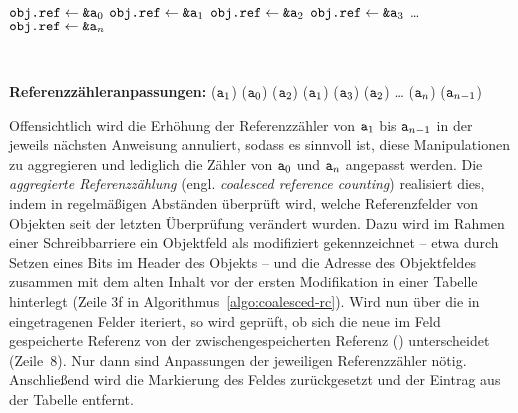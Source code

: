 \begin{center}
\begin{minipage}{0.3\textwidth}
	\centering
	\begin{algorithmic}[1]
		\Statex $\texttt{obj.ref} \gets \texttt{\&a}_0$
		\Statex $\texttt{obj.ref} \gets \texttt{\&a}_1$
		\Statex $\texttt{obj.ref} \gets \texttt{\&a}_2$
		\Statex $\texttt{obj.ref} \gets \texttt{\&a}_3$
		\Statex \dots
		\Statex $\texttt{obj.ref} \gets \texttt{\&a}_n$
	\end{algorithmic}
\end{minipage}~
\begin{minipage}{0.6\textwidth}
	\centering
	\begin{algorithmic}[1]
		\Statex \textbf{Referenzzähleranpassungen:}
		\Statex {}($\texttt{a}_1$) \quad {}($\texttt{a}_0$)
		\Statex {}($\texttt{a}_2$) \quad {}($\texttt{a}_1$)
		\Statex {}($\texttt{a}_3$) \quad {}($\texttt{a}_2$)
		\Statex \dots
		\Statex {}($\texttt{a}_n$) \quad {}($\texttt{a}_{n-1}$)
	\end{algorithmic}
\end{minipage}
\end{center}

Offensichtlich wird die Erhöhung der Referenzzähler von $\texttt{a}_1$ bis $\texttt{a}_{n-1}$ in der jeweils nächsten Anweisung annuliert, sodass es sinnvoll ist, diese Manipulationen zu aggregieren und lediglich die Zähler von $\texttt{a}_0$ und $\texttt{a}_n$ angepasst werden.
Die \textit{aggregierte Referenzzählung} (engl. \textit{coalesced reference counting}) realisiert dies, indem in regelmäßigen Abständen überprüft wird, welche Referenzfelder von Objekten seit der letzten Überprüfung verändert wurden.
Dazu wird im Rahmen einer Schreibbarriere ein Objektfeld als modifiziert gekennzeichnet -- etwa durch Setzen eines Bits im Header des Objekts -- und die Adresse des Objektfeldes zusammen mit dem alten Inhalt vor der ersten Modifikation in einer Tabelle  hinterlegt (Zeile 3f in Algorithmus~\ref{algo:coalesced-rc}).
Wird nun über die in  eingetragenen Felder iteriert, so wird geprüft, ob sich die neue im Feld gespeicherte Referenz  von der zwischengespeicherten Referenz () unterscheidet (Zeile~8).
Nur dann sind Anpassungen der jeweiligen Referenzzähler nötig.
Anschließend wird die Markierung des Feldes zurückgesetzt und der Eintrag aus der Tabelle entfernt.

